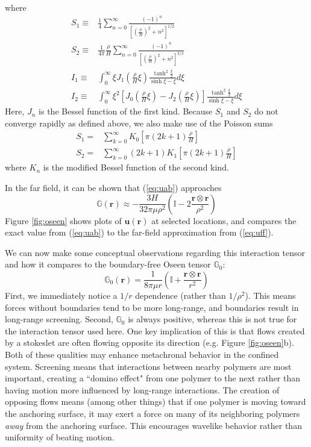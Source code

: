 \documentclass[11pt]{ucthesis}
\begin{document}
where
\begin{align*}
S_1\equiv&\frac14\sum_{n=0}^\infty \frac{(-1)^n}{\left[\left(\frac{\rho}{H}\right)^2 + n^2\right]^{1/2}}\\
S_2\equiv&\frac{1}{4\pi}\frac\rho H\sum_{n=0}^\infty \frac{(-1)^n}{\left[\left(\frac{\rho}{H}\right)^2 + n^2\right]^{3/2}}\\
I_1\equiv&\int_0^\infty \xi J_1\left(\frac\rho H \xi\right)\frac{\tanh^2\frac\xi 2}{\sinh\xi - \xi}d\xi\\
I_2\equiv&\int_0^\infty \xi^2\left[J_0\left(\frac\rho H \xi\right) -J_2\left(\frac\rho H \xi\right)\right]\frac{\tanh^2\frac\xi 2}{\sinh\xi - \xi}d\xi
\end{align*}
Here, $J_n$ is the Bessel function of the first kind. Because $S_1$ and $S_2$ do not converge rapidly as defined above, we also make use of the Poisson sums
\begin{align*}
S_1 =& \sum_{k=0}^\infty K_0\left[\pi(2k+1)\frac\rho H\right]\\
S_2 =& \sum_{k=0}^\infty (2k+1) K_1\left[\pi(2k+1)\frac\rho H\right]
\end{align*}
where $K_n$ is the modified Bessel function of the second kind.

In the far field, it can be shown that (\ref{eq:uab}) approaches
\begin{equation}
\label{eq:uff}
\mathbb{G}\mathbf{(r)} \approx -\frac{3H}{32\pi\mu\rho^2}\left(\mathbb{I} -2\frac{\mathbf{r\otimes r}}{\rho^2}\right)
\end{equation}
Figure \ref{fig:oseen} shows plots of $\mathbf{u(r)}$ at selected locations, and compares the exact value from (\ref{eq:uab}) to the far-field approximation from (\ref{eq:uff}).

We can now make some conceptual observations regarding this interaction tensor and how it compares to the boundary-free Oseen tensor $\mathbb{G}_0$:
\[
\mathbb{G}_{0}(\mathbf{r}) = \frac{1}{8\pi\mu r}\left(\mathbb{I} + \frac{\mathbf{r\otimes r}}{r^2}\right)
\]
First, we immediately notice a $1/r$ dependence (rather than $1/\rho^2$). This means forces without boundaries tend to be more long-range, and boundaries result in long-range screening. Second, $\mathbb{G}_{0}$ is always positive, whereas this is not true for the interaction tensor used here. One key implication of this is that flows created by a stokeslet are often flowing opposite its direction (e.g. Figure \ref{fig:oseen}b). Both of these qualities may enhance metachronal behavior in the confined system. Screening means that interactions between nearby polymers are most important, creating a ``domino effect" from one polymer to the next rather than having motion more influenced by long-range interactions. The creation of opposing flows means (among other things) that if one polymer is moving toward the anchoring surface, it may exert a force on many of its neighboring polymers \textit{away} from the anchoring surface. This encourages wavelike behavior rather than uniformity of beating motion.
\end{document}
